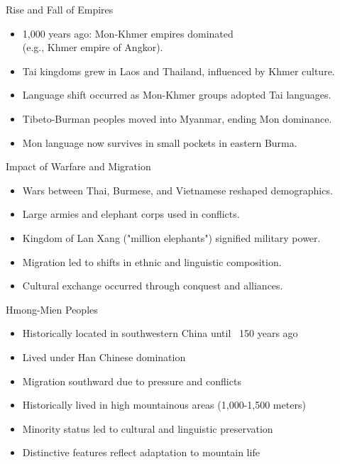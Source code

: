 \documentclass{beamer}
\begin{document}
\begin{frame}{Rise and Fall of Empires}
    \begin{itemize}
    \item 1,000 years ago: Mon-Khmer empires dominated
      \\ (e.g., Khmer empire of Angkor).
    \item Tai kingdoms grew in Laos and Thailand, influenced by Khmer culture.
    \item Language shift occurred as Mon-Khmer groups adopted Tai languages.
    \item Tibeto-Burman peoples moved into Myanmar, ending Mon dominance.
    \item Mon language now survives in small pockets in eastern Burma.
    \end{itemize}
  \end{frame}

\begin{frame}{Impact of Warfare and Migration}
    \begin{itemize}
        \item Wars between Thai, Burmese, and Vietnamese reshaped demographics.
        \item Large armies and elephant corps used in conflicts.
        \item Kingdom of Lan Xang ("million elephants") signified military power.
        \item Migration led to shifts in ethnic and linguistic composition.
        \item Cultural exchange occurred through conquest and alliances.
    \end{itemize}
\end{frame}

\begin{frame}{Hmong-Mien Peoples}
    \begin{itemize}
        \item Historically located in southwestern China until ~150 years ago
        \item Lived under Han Chinese domination
        \item Migration southward due to pressure and conflicts
        \item Historically lived in high mountainous areas (1,000-1,500 meters)
        \item Minority status led to cultural and linguistic preservation
        \item Distinctive features reflect adaptation to mountain life
     \end{itemize}
\end{frame}
\end{document}

